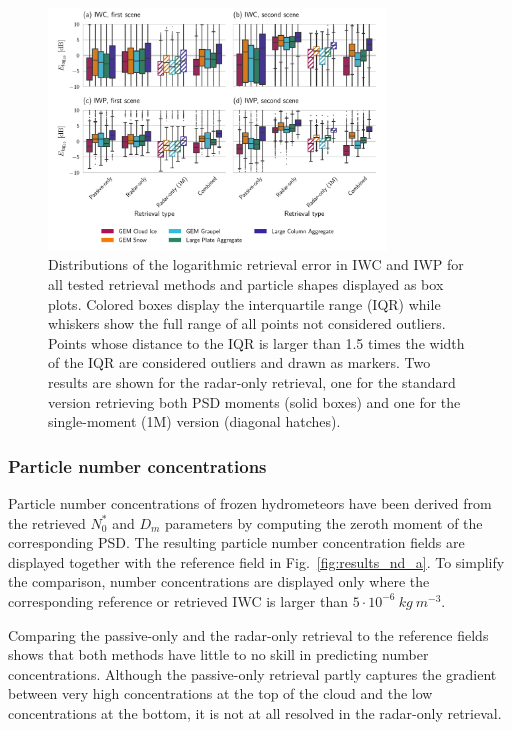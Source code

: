 \documentclass[journal abbreviation, manuscript]{copernicus}
\begin{document}
\begin{figure}[!h]
\centering \includegraphics[width = 0.8\textwidth]{../plots/results_box}
\caption{Distributions of the logarithmic retrieval error in IWC and IWP for all
  tested retrieval methods and particle shapes displayed as box plots. Colored
  boxes display the interquartile range (IQR) while whiskers show the full range
  of all points not considered outliers. Points whose distance to the IQR is
  larger than 1.5 times the width of the IQR are considered outliers and drawn
  as markers. Two results are shown for the radar-only retrieval, one for the
  standard version retrieving both PSD moments (solid boxes) and one for the
  single-moment (1M) version (diagonal hatches).}
\label{fig:boxes}
\end{figure}

\subsubsection{Particle number concentrations}

Particle number concentrations of frozen hydrometeors have been derived from the
retrieved $N_0^*$ and $D_m$ parameters by computing the zeroth moment of the
corresponding PSD. The resulting particle number concentration fields are
displayed together with the reference field in Fig.~\ref{fig:results_nd_a}. To
simplify the comparison, number concentrations are displayed only where the
corresponding reference or retrieved IWC is larger than
$5 \cdot 10^{-6}\ \unit{kg\ m^{-3}}$.

Comparing the passive-only and the radar-only retrieval to the reference fields
shows that both methods have little to no skill in predicting number 
concentrations. Although the passive-only retrieval partly captures the gradient
between very high concentrations at the top of the cloud and the low
concentrations at the bottom, it is not at all resolved in the radar-only
retrieval.
\end{document}
